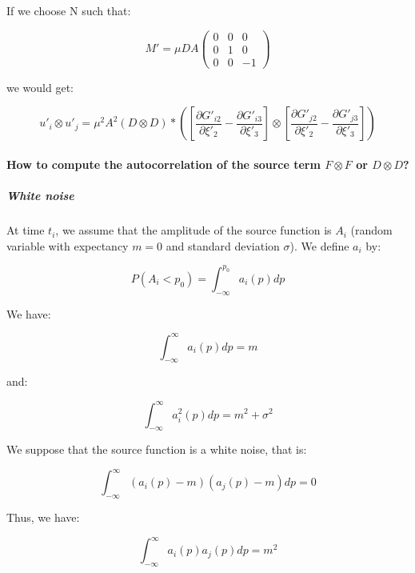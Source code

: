 \documentclass[methods.tex]{subfiles}
\begin{document}
If we choose N such that:

\begin{equation}
M' = \mu D A \begin{pmatrix}
0 & 0 & 0 \\
0 & 1 & 0 \\
0 & 0 & -1
\end{pmatrix}
\end{equation}

we would get:

\begin{equation}
u'_i \otimes u'_j = \mu^2 A^2 (D \otimes D) * ([\frac{\partial G'_{i2}}{\partial \xi'_2} - \frac{\partial G'_{i3}}{\partial \xi'_3}] \otimes [\frac{\partial G'_{j2}}{\partial \xi'_2} - \frac{\partial G'_{j3}}{\partial \xi'_3}])
\end{equation}

\paragraph{How to compute the autocorrelation of the source term $F \otimes F$ or $D \otimes D$?}

\subparagraph{White noise}

At time $t_i$, we assume that the amplitude of the source function is $A_i$ (random variable with expectancy $m = 0$ and standard deviation $\sigma$). We define $a_i$ by:

\begin{equation}
P (A_i < p_0) = \int_{- \infty}^{p_0} a_i (p) dp
\end{equation}

We have:

\begin{equation}
\int_{- \infty}^{\infty} a_i (p) dp = m
\end{equation}

and:

\begin{equation}
\int_{- \infty}^{\infty} a_i^2 (p) dp = m^2 + \sigma ^2
\end{equation}

We suppose that the source function is a white noise, that is:

\begin{equation}
\int_{- \infty}^{\infty} (a_i (p) - m) (a_j (p) - m) dp = 0
\end{equation}

Thus, we have:

\begin{equation}
\int_{- \infty}^{\infty} a_i (p) a_j (p) dp = m^2
\end{equation}
\end{document}
